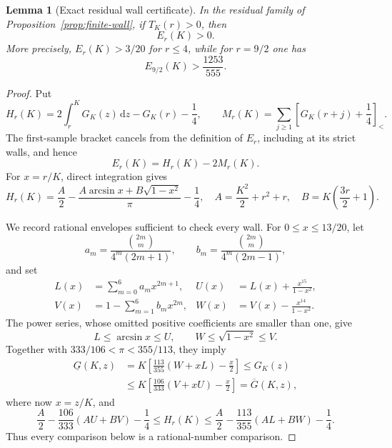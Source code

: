 \documentclass[11pt]{article}
\newtheorem{lemma}[theorem]{Lemma}
\theoremstyle{remark}
\newcommand{\sbr}[1]{[#1]_{<}}
\newcommand{\dd}{\,\mathrm d}
\begin{document}
\begin{lemma}[Exact residual wall certificate]
\label{lem:exact-wall-certificate}
In the residual family of Proposition~\ref{prop:finite-wall}, if
$T_K(r)>0$, then
\begin{equation}
 E_r(K)>0.
 \label{eq:exact-wall-positive}
\end{equation}
More precisely, $E_r(K)>3/20$ for $r\leq4$, while for $r=9/2$ one has
\[
 E_{9/2}(K)>\frac{1253}{555}.
\]
\end{lemma}

\begin{proof}
Put
\[
 H_r(K)=2\int_r^K G_K(z)\dd z-G_K(r)-\frac14,
 \qquad
 M_r(K)=\sum_{j\geq1}\sbr{G_K(r+j)+\frac14}.
\]
The first-sample bracket cancels from the definition of $E_r$, including
at its strict walls, and hence
\begin{equation}
 E_r(K)=H_r(K)-2M_r(K).
 \label{eq:E-as-H-minus-M}
\end{equation}
For $x=r/K$, direct integration gives
\begin{equation}
 H_r(K)=\frac A2-
 \frac{A\arcsin x+B\sqrt{1-x^2}}{\pi}-\frac14,
 \quad
 A=\frac{K^2}{2}+r^2+r,
 \quad
 B=K\left(\frac{3r}{2}+1\right).
 \label{eq:H-closed-form}
\end{equation}

We record rational envelopes sufficient to check every wall.  For
$0\leq x\leq13/20$, let
\[
 a_m=\frac{\binom{2m}{m}}{4^m(2m+1)},
 \qquad
 b_m=\frac{\binom{2m}{m}}{4^m(2m-1)},
\]
and set
\[
 \begin{aligned}
 L(x)&=\sum_{m=0}^{6}a_mx^{2m+1},&
 U(x)&=L(x)+\frac{x^{15}}{1-x^2},\\
 V(x)&=1-\sum_{m=1}^{6}b_mx^{2m},&
 W(x)&=V(x)-\frac{x^{14}}{1-x^2}.
 \end{aligned}
\]
The power series, whose omitted positive coefficients are smaller than
one, give
\[
 L\leq\arcsin x\leq U,
 \qquad
 W\leq\sqrt{1-x^2}\leq V.
\]
Together with $333/106<\pi<355/113$, they imply
\begin{equation}
 \begin{aligned}
 \underline G(K,z)
 &=K\left[\frac{113}{355}(W+xL)-\frac x2\right]
 \leq G_K(z)\\
 &\leq
 K\left[\frac{106}{333}(V+xU)-\frac x2\right]
 =\overline G(K,z),
 \end{aligned}
 \label{eq:rational-G-envelope}
\end{equation}
where now $x=z/K$, and
\begin{equation}
 \frac A2-\frac{106}{333}(AU+BV)-\frac14
 \leq H_r(K)\leq
 \frac A2-\frac{113}{355}(AL+BW)-\frac14.
 \label{eq:rational-H-envelope}
\end{equation}
Thus every comparison below is a rational-number comparison.


\end{proof}
\end{document}
